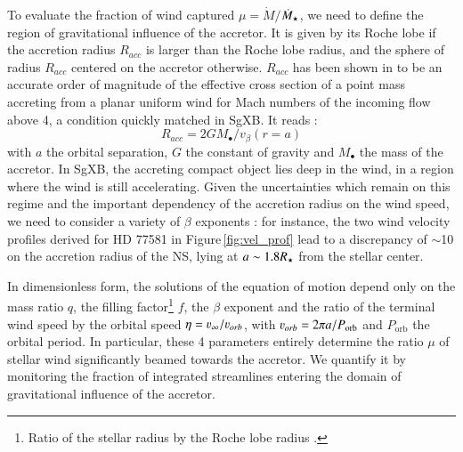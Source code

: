 \documentclass[letter]{aa}
\makeatletter
\newcommand{\sgx}{SgXB\xspace}
\newcommand*{\ns}{NS\@\xspace}
\newcommand{\mystar}{{\fontfamily{lmr}\selectfont$\star$}}
\newcommand*{\mdotstar}{$\dot{M}_{\text{\mystar}}$\@\xspace}
\makeatother
\begin{document}
To evaluate the fraction of wind captured $\mu=\dot{M}/$\mdotstar, we need to define the region of gravitational influence of the accretor. It is given by its Roche lobe if the accretion radius $R_{acc}$ is larger than the Roche lobe radius, and the sphere of radius $R_{acc}$ centered on the accretor otherwise. $R_{acc}$ has been shown in \cite{ElMellah2015} to be an accurate order of magnitude of the effective cross section of a point mass accreting from a planar uniform wind for Mach numbers of the incoming flow above 4, a condition quickly matched in \sgx. It reads :
\begin{equation}
R_{acc}=2GM_{\bullet}/v_{\beta}(r=a)
\end{equation}
with $a$ the orbital separation, $G$ the constant of gravity and $M_{\bullet}$ the mass of the accretor. In \sgx, the accreting compact object lies deep in the wind, in a region where the wind is still accelerating. Given the uncertainties which remain on this regime and the important dependency of the accretion radius on the wind speed, we need to consider a variety of $\beta$ exponents : for instance, the two wind velocity profiles derived for HD 77581 in Figure\,\ref{fig:vel_prof} lead to a discrepancy of $\sim$10 on the accretion radius of the \ns, lying at $a\sim1.8R_{\text{\mystar}}$ from the stellar center.

In dimensionless form, the solutions of the equation of motion depend only on the mass ratio $q$, the filling factor\footnote{Ratio of the stellar radius by the Roche lobe radius \citep{Eggleton1983}.} $f$, the $\beta$ exponent and the ratio of the terminal wind speed by the orbital speed $\eta=\varv_{\infty}/\varv_{orb}$, with $\varv_{orb}=2\pi a/P_{\text{orb}}$ and $P_{\text{orb}}$ the orbital period. In particular, these 4 parameters entirely determine the ratio $\mu$ of stellar wind significantly beamed towards the accretor. We quantify it by monitoring the fraction of integrated streamlines entering the domain of gravitational influence of the accretor.
\end{document}
